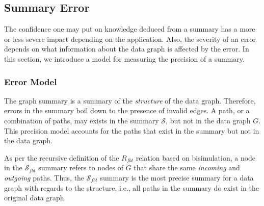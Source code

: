 \subsection{Summary Error}

The confidence one may put on knowledge deduced from a summary has a more or less severe impact depending on the application. Also, the severity of an error depends on what information about the data graph is affected by the error. In this section, we introduce a model for measuring the precision of a summary.

\subsubsection{Error Model}

The graph summary is a summary of the \emph{structure} of the data graph. Therefore, errors in the summary boil down to the presence of invalid edges. A path, or a combination of paths, may exists in the summary $\mathcal{S}$, but not in the data graph $G$. This precision model accounts for the paths that exist in the summary but not in the data graph.

%

As per the recursive definition of the $R_{fbt}$ relation based on bisimulation, a node in the $\mathcal{S}_{fbt}$ summary refers to nodes of $G$ that share the same \emph{incoming} and \emph{outgoing} paths. Thus, the $\mathcal{S}_{fbt}$ summary is the most precise summary for a data graph with regards to the structure, i.e., all paths in the summary do exist in the original data graph.

